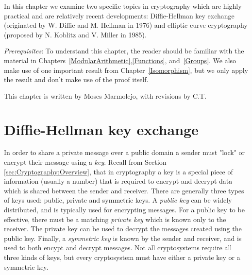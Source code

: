 
In this chapter we examine two specific topics in cryptography which are highly practical and are relatively recent developments: Diffie-Hellman key exchange (originated by W. Diffie and M. Hellman in 1976) and elliptic curve cryptography (proposed by N. Koblitz and V. Miller in 1985).
\medskip

\noindent
\emph{Prerequisites}: 
To understand this chapter, the reader should be familiar with the material in  Chapters~\ref{ModularArithmetic},\ref{Functions}, and~\ref{Groups}. We also make use of one important result from Chapter~\ref{Isomorphism}, but we only apply the result and don't make use of the proof itself.  
\bigskip

This chapter is written by Moses Marmolejo, with revisions by C.T.

\section{Diffie-Hellman key exchange}
\label{sec:FurtherCryptography:DiffieHellmanKeyExchange}

In order to share a private message over a public domain a sender must  "lock" or encrypt their message using a \emph{key}.  Recall from Section \ref{sec:Cryptography:Overview}, that in cryptography a  key is a special piece of information (usually a number)  that is required to encrypt and decrypt data which is shared between the sender and receiver. There are generally three types of keys used: public, private and symmetric keys. A \emph{public key} can be widely distributed, and is typically used for encrypting messages.  For a public key to be effective, there must be a matching \emph{private key} which is known only to the receiver. The private key can be used to decrypt the messages created using the public key.  Finally, a \emph{symmetric key} is known by the sender and receiver, and is used to both encypt and decrypt messages.  Not all cryptosystems require all three kinds of keys, but every cryptosystem must have either a private key or a symmetric key.

